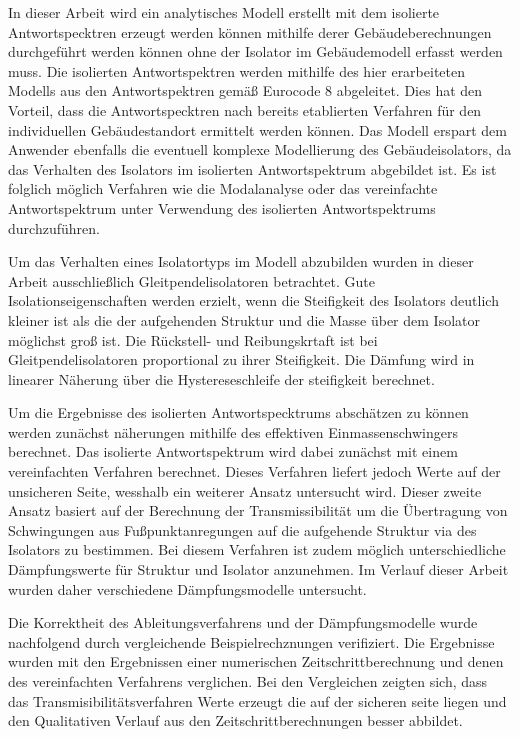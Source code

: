 
In dieser Arbeit wird ein analytisches Modell erstellt mit dem isolierte Antwortspecktren erzeugt werden können mithilfe derer Gebäudeberechnungen durchgeführt werden können ohne der Isolator im Gebäudemodell erfasst werden muss.
Die isolierten Antwortspektren werden mithilfe des hier erarbeiteten Modells aus den Antwortspektren gemäß Eurocode 8 abgeleitet.
Dies hat den Vorteil, dass die Antwortspecktren nach bereits etablierten Verfahren für den individuellen Gebäudestandort ermittelt werden können.
Das Modell erspart dem Anwender ebenfalls die eventuell komplexe Modellierung des Gebäudeisolators, da das Verhalten des Isolators im isolierten Antwortspektrum abgebildet ist.
Es ist folglich möglich Verfahren wie die Modalanalyse oder das vereinfachte Antwortspektrum unter Verwendung des isolierten Antwortspektrums durchzuführen.

Um das Verhalten eines Isolatortyps im Modell abzubilden wurden in dieser Arbeit ausschließlich Gleitpendelisolatoren betrachtet.
Gute Isolationseigenschaften werden erzielt, wenn die Steifigkeit des Isolators deutlich kleiner ist als die der aufgehenden Struktur und die Masse über dem Isolator möglichst groß ist.
Die Rückstell- und Reibungskrtaft ist bei Gleitpendelisolatoren proportional zu ihrer Steifigkeit.
Die Dämfung wird in linearer Näherung über die Hystereseschleife der steifigkeit berechnet.

Um die Ergebnisse des isolierten Antwortspecktrums abschätzen zu können werden zunächst näherungen mithilfe des effektiven Einmassenschwingers berechnet. \cite{Kelly}
Das isolierte Antwortspektrum wird dabei zunächst mit einem vereinfachten Verfahren berechnet. Dieses Verfahren liefert jedoch Werte auf der unsicheren Seite, wesshalb ein weiterer Ansatz untersucht wird.
Dieser zweite Ansatz basiert auf der Berechnung der Transmissibilität um die Übertragung von Schwingungen aus Fußpunktanregungen auf die aufgehende Struktur via des Isolators zu bestimmen.
Bei diesem  Verfahren ist zudem möglich unterschiedliche Dämpfungswerte für Struktur und Isolator anzunehmen.
Im Verlauf dieser Arbeit wurden daher verschiedene Dämpfungsmodelle untersucht.

Die Korrektheit des Ableitungsverfahrens und der Dämpfungsmodelle wurde nachfolgend durch vergleichende Beispielrechznungen verifiziert.
Die Ergebnisse wurden mit den Ergebnissen einer numerischen Zeitschrittberechnung und denen des vereinfachten Verfahrens verglichen.
Bei den Vergleichen zeigten sich, dass das Transmisibilitätsverfahren Werte erzeugt die auf der sicheren seite liegen und den Qualitativen Verlauf aus den Zeitschrittberechnungen besser abbildet.

